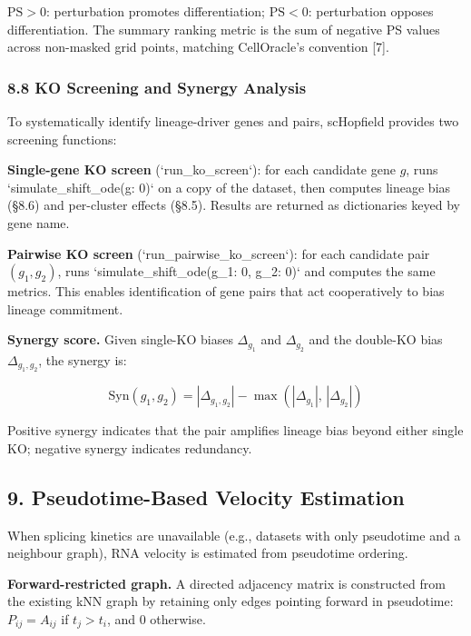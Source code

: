 \documentclass[11pt]{article}
\begin{document}
$\mathrm{PS} > 0$: perturbation promotes differentiation; $\mathrm{PS} < 0$: perturbation opposes differentiation. The summary ranking metric is the sum of negative PS values across non-masked grid points, matching CellOracle's convention [7].


\subsubsection*{8.8 KO Screening and Synergy Analysis}

To systematically identify lineage-driver genes and pairs, scHopfield provides two screening functions:

\textbf{Single-gene KO screen} (`run\_ko\_screen`): for each candidate gene $g$, runs `simulate\_shift\_ode({g: 0})` on a copy of the dataset, then computes lineage bias (§8.6) and per-cluster effects (§8.5). Results are returned as dictionaries keyed by gene name.

\textbf{Pairwise KO screen} (`run\_pairwise\_ko\_screen`): for each candidate pair $(g_1, g_2)$, runs `simulate\_shift\_ode({g\_1: 0, g\_2: 0})` and computes the same metrics. This enables identification of gene pairs that act cooperatively to bias lineage commitment.

\textbf{Synergy score.} Given single-KO biases $\Delta_{g_1}$ and $\Delta_{g_2}$ and the double-KO bias $\Delta_{g_1,g_2}$, the synergy is:

\begin{equation}
\mathrm{Syn}(g_1, g_2) = |\Delta_{g_1,g_2}| - \max\!\left(|\Delta_{g_1}|,\, |\Delta_{g_2}|\right) 
\end{equation}

Positive synergy indicates that the pair amplifies lineage bias beyond either single KO; negative synergy indicates redundancy.



\subsection*{9. Pseudotime-Based Velocity Estimation}

When splicing kinetics are unavailable (e.g., datasets with only pseudotime and a neighbour graph), RNA velocity is estimated from pseudotime ordering.

\textbf{Forward-restricted graph.} A directed adjacency matrix is constructed from the existing kNN graph by retaining only edges pointing forward in pseudotime: $P_{ij} = A_{ij}$ if $t_j > t_i$, and 0 otherwise.
\end{document}
